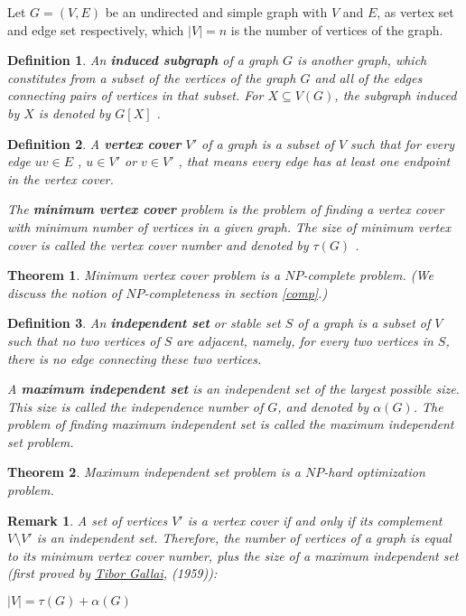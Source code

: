 \documentclass[12pt]{article}
\theoremstyle{slplain}
\newtheorem{theorem}{Theorem}
\newtheorem{defi}{Definition}
\newtheorem{rema}{Remark}
\begin{document}
Let $G = (V, E)$ be an undirected and simple graph with $V$ and $E$, as vertex set and edge set respectively, which $|V| = n$ is the number of vertices of the graph.



\begin{defi}
An {\bf induced subgraph} of a graph $G$ is another graph, which constitutes from a subset of the vertices of the graph $G$ and all of the edges connecting pairs of vertices in that subset. For $X \subseteq V(G)$, the subgraph induced by $X$ is denoted by $G[X]$ .
\end{defi}


\begin{defi}
A {\bf vertex cover} $V'$ of a graph is a subset of $V$ such that for every edge $uv \in E$ , $u \in V'$ or $v \in V'$ , that means every edge has at least one endpoint in the vertex cover. 

The {\bf minimum vertex cover} problem is the problem of finding a vertex  cover with minimum number of vertices in a given graph. The size of minimum vertex cover is called the vertex cover number and denoted by $\tau(G)$ .
\end{defi}

\begin{theorem}
Minimum vertex cover problem is a $NP$-complete problem.\cite{cormen} (We discuss the notion of $NP$-completeness in section \ref{comp}.) 
\end{theorem}

\begin{defi}
An {\bf independent set} or stable set $S$ of a graph is a subset
of $V$ such that no two vertices of $S$ are adjacent, namely, for every two
vertices in $S$, there is no edge connecting these two vertices. 

A {\bf maximum independent set} is an independent set of the largest possible size. This size is called the independence number of $G$, and denoted by $\alpha(G)$. The problem of finding maximum independent set is called the maximum independent set problem.
\end{defi}

\begin{theorem}	
Maximum independent set problem is a $NP$-hard optimization problem.\cite{karp}
\end{theorem}

\begin{rema}
A set of vertices $V'$ is a vertex cover if and only if its complement
$V \setminus V'$ is an independent set. Therefore, the number of vertices of a graph
is equal to its minimum vertex cover number, plus the size of a maximum
independent set (first proved by \href{https://en.wikipedia.org/wiki/Tibor_Gallai}{Tibor Gallai}, (1959)\cite{gallai}):

\vspace{0.5cm}
\begin{center}
$|V| = \tau(G) + \alpha(G)$
\end{center}
\end{rema}
\end{document}
